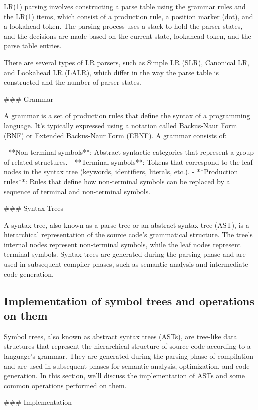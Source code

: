\documentclass{article}
\begin{document}
LR(1) parsing involves constructing a parse table using the grammar rules and the LR(1) items, which consist of a production rule, a position marker (dot), and a lookahead token. The parsing process uses a stack to hold the parser states, and the decisions are made based on the current state, lookahead token, and the parse table entries.

There are several types of LR parsers, such as Simple LR (SLR), Canonical LR, and Lookahead LR (LALR), which differ in the way the parse table is constructed and the number of parser states.

### Grammar

A grammar is a set of production rules that define the syntax of a programming language. It's typically expressed using a notation called Backus-Naur Form (BNF) or Extended Backus-Naur Form (EBNF). A grammar consists of:

- **Non-terminal symbols**: Abstract syntactic categories that represent a group of related structures.
- **Terminal symbols**: Tokens that correspond to the leaf nodes in the syntax tree (keywords, identifiers, literals, etc.).
- **Production rules**: Rules that define how non-terminal symbols can be replaced by a sequence of terminal and non-terminal symbols.

### Syntax Trees

A syntax tree, also known as a parse tree or an abstract syntax tree (AST), is a hierarchical representation of the source code's grammatical structure. The tree's internal nodes represent non-terminal symbols, while the leaf nodes represent terminal symbols. Syntax trees are generated during the parsing phase and are used in subsequent compiler phases, such as semantic analysis and intermediate code generation.


\subsection{Implementation of symbol trees and operations on them}
Symbol trees, also known as abstract syntax trees (ASTs), are tree-like data structures that represent the hierarchical structure of source code according to a language's grammar. They are generated during the parsing phase of compilation and are used in subsequent phases for semantic analysis, optimization, and code generation. In this section, we'll discuss the implementation of ASTs and some common operations performed on them.

### Implementation
\end{document}
